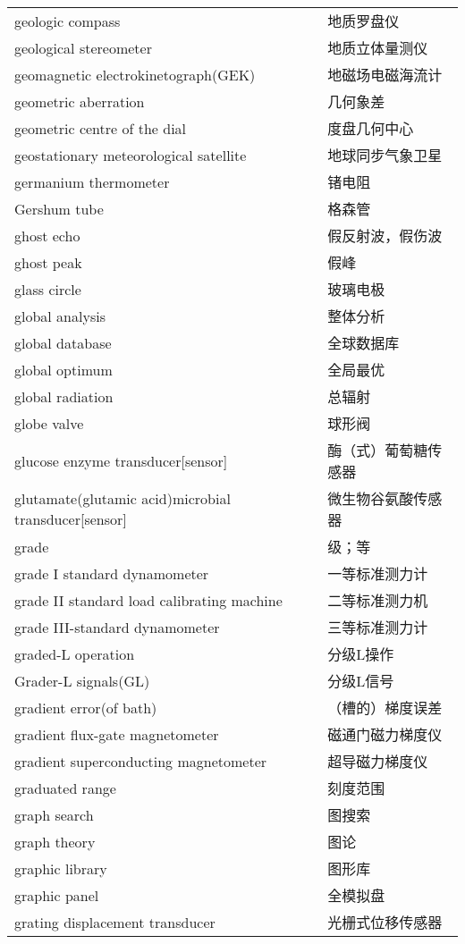 \documentclass[
]{article}
\begin{document}
\begin{longtable}[]{@{}ll@{}}
geologic compass & 地质罗盘仪 \\
geological stereometer & 地质立体量测仪 \\
geomagnetic electrokinetograph(GEK) & 地磁场电磁海流计 \\
geometric aberration & 几何象差 \\
geometric centre of the dial & 度盘几何中心 \\
geostationary meteorological satellite & 地球同步气象卫星 \\
germanium thermometer & 锗电阻 \\
Gershum tube & 格森管 \\
ghost echo & 假反射波，假伤波 \\
ghost peak & 假峰 \\
glass circle & 玻璃电极 \\
global analysis & 整体分析 \\
global database & 全球数据库 \\
global optimum & 全局最优 \\
global radiation & 总辐射 \\
globe valve & 球形阀 \\
glucose enzyme transducer{[}sensor{]} & 酶（式）葡萄糖传感器 \\
glutamate(glutamic acid)microbial transducer{[}sensor{]} &
微生物谷氨酸传感器 \\
grade & 级；等 \\
grade I standard dynamometer & 一等标准测力计 \\
grade II standard load calibrating machine & 二等标准测力机 \\
grade III-standard dynamometer & 三等标准测力计 \\
graded-L operation & 分级L操作 \\
Grader-L signals(GL) & 分级L信号 \\
gradient error(of bath) & （槽的）梯度误差 \\
gradient flux-gate magnetometer & 磁通门磁力梯度仪 \\
gradient superconducting magnetometer & 超导磁力梯度仪 \\
graduated range & 刻度范围 \\
graph search & 图搜索 \\
graph theory & 图论 \\
graphic library & 图形库 \\
graphic panel & 全模拟盘 \\
grating displacement transducer & 光栅式位移传感器 \\

\end{longtable}
\end{document}

